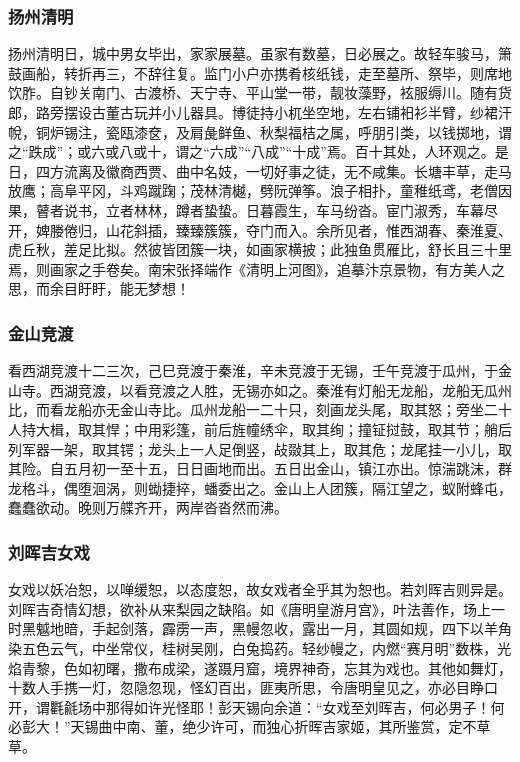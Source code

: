 \documentclass[]{article}
\begin{document}
\hypertarget{header-n408}{%
\subsubsection{扬州清明}\label{header-n408}}

扬州清明日，城中男女毕出，家家展墓。虽家有数墓，日必展之。故轻车骏马，箫鼓画船，转折再三，不辞往复。监门小户亦携肴核纸钱，走至墓所、祭毕，则席地饮胙。自钞关南门、古渡桥、天宁寺、平山堂一带，靓妆藻野，袨服缛川。随有货郎，路旁摆设古董古玩并小儿器具。博徒持小杌坐空地，左右铺衵衫半臂，纱裙汗帨，铜炉锡注，瓷瓯漆奁，及肩彘鲜鱼、秋梨福桔之属，呼朋引类，以钱掷地，谓之``跌成''；或六或八或十，谓之``六成''``八成''``十成''焉。百十其处，人环观之。是日，四方流离及徽商西贾、曲中名妓，一切好事之徒，无不咸集。长塘丰草，走马放鹰；高阜平冈，斗鸡蹴踘；茂林清樾，劈阮弹筝。浪子相扑，童稚纸鸢，老僧因果，瞽者说书，立者林林，蹲者蛰蛰。日暮霞生，车马纷沓。宦门淑秀，车幕尽开，婢媵倦归，山花斜插，臻臻簇簇，夺门而入。余所见者，惟西湖春、秦淮夏、虎丘秋，差足比拟。然彼皆团簇一块，如画家横披；此独鱼贯雁比，舒长且三十里焉，则画家之手卷矣。南宋张择端作《清明上河图》，追摹汴京景物，有方美人之思，而余目盱盱，能无梦想！

\hypertarget{header-n413}{%
\subsubsection{金山竞渡}\label{header-n413}}

看西湖竞渡十二三次，己巳竞渡于秦淮，辛未竞渡于无锡，壬午竞渡于瓜州，于金山寺。西湖竞渡，以看竞渡之人胜，无锡亦如之。秦淮有灯船无龙船，龙船无瓜州比，而看龙船亦无金山寺比。瓜州龙船一二十只，刻画龙头尾，取其怒；旁坐二十人持大楫，取其悍；中用彩篷，前后旌幢绣伞，取其绚；撞钲挝鼓，取其节；艄后列军器一架，取其锷；龙头上一人足倒竖，敁敠其上，取其危；龙尾挂一小儿，取其险。自五月初一至十五，日日画地而出。五日出金山，镇江亦出。惊湍跳沫，群龙格斗，偶堕洄涡，则蜐捷捽，蟠委出之。金山上人团簇，隔江望之，蚁附蜂屯，蠢蠢欲动。晚则万艓齐开，两岸沓沓然而沸。

\hypertarget{header-n418}{%
\subsubsection{刘晖吉女戏}\label{header-n418}}

女戏以妖冶恕，以啴缓恕，以态度恕，故女戏者全乎其为恕也。若刘晖吉则异是。刘晖吉奇情幻想，欲补从来梨园之缺陷。如《唐明皇游月宫》，叶法善作，场上一时黑魆地暗，手起剑落，霹雳一声，黑幔忽收，露出一月，其圆如规，四下以羊角染五色云气，中坐常仪，桂树吴刚，白兔捣药。轻纱幔之，内燃``赛月明''数株，光焰青黎，色如初曙，撒布成梁，遂蹑月窟，境界神奇，忘其为戏也。其他如舞灯，十数人手携一灯，忽隐忽现，怪幻百出，匪夷所思，令唐明皇见之，亦必目睁口开，谓氍毹场中那得如许光怪耶！彭天锡向余道：``女戏至刘晖吉，何必男子！何必彭大！''天锡曲中南、董，绝少许可，而独心折晖吉家姬，其所鉴赏，定不草草。
\end{document}
